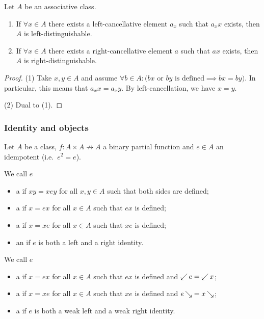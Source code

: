 \begin{lemma}
Let $A$ be an associative class.
\begin{enumerate}
\item If $\forall x\in A$ there exists a left-cancellative element $a_x$ such that $a_xx$ exists, then $A$ is left-distinguishable.
\item If $\forall x\in A$ there exists a right-cancellative element $a$ such that $ax$ exists, then $A$ is right-distinguishable.
\end{enumerate}
\end{lemma}
\begin{proof}
(1) Take $x,y\in A$ and assume $\forall b\in A: \Big(\text{$bx$ or $by$ is defined} \implies bx = by\Big)$. In particular, this means that $a_xx = a_xy$. By left-cancellation, we have $x=y$.

(2) Dual to (1).
\end{proof}

\subsubsection{Identity and objects}
\begin{definition}
Let $A$ be a class, $f: A\times A \not\to A$ a binary partial function and $e\in A$ an idempotent (i.e.\ $e^2 = e$).

We call $e$
\begin{itemize}
\item a  if $xy = xey$ for all $x,y\in A$ such that both sides are defined;
\item a  if $x = ex$ for all $x\in A$ such that $ex$ is defined;
\item a  if $x = xe$ for all $x\in A$ such that $xe$ is defined;
\item an  if $e$ is both a left and a right identity.
\end{itemize}

We call $e$
\begin{itemize}
\item a  if $x = ex$ for all $x\in A$ such that $ex$ is defined and $\mathop{\swarrow}e = \mathop{\swarrow}x$;
\item a  if $x = xe$ for all $x\in A$ such that $xe$ is defined and $e\mathop{\searrow} = x\mathop{\searrow}$;
\item a  if $e$ is both a weak left and a weak right identity.
\end{itemize}
\end{definition}

